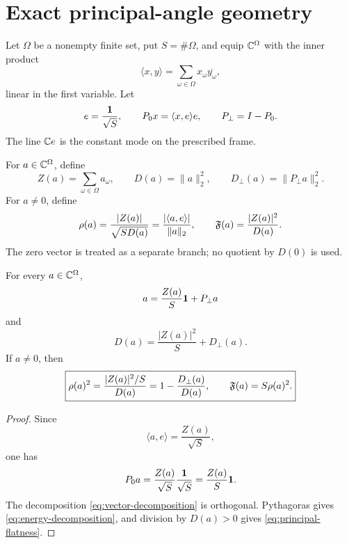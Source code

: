 \section{Exact principal-angle geometry}
\label{sec:principal-angle-geometry}

Let \(\Omega\) be a nonempty finite set, put \(S=\#\Omega\), and
equip \(\mathbb C^\Omega\) with the inner product
\[
 \langle x,y\rangle
 =\sum_{\omega\in\Omega}x_\omega\overline{y_\omega},
\]
linear in the first variable.  Let
\[
 e=\frac{\mathbf 1}{\sqrt S},\qquad
 P_0x=\langle x,e\rangle e,\qquad
 P_\perp=I-P_0.
\]
The line \(\mathbb C e\) is the constant mode on the prescribed frame.

\begin{definition}
\label{def:literal-finite-statistics}
For \(a\in\mathbb C^\Omega\), define
\[
 Z(a)=\sum_{\omega\in\Omega}a_\omega,\qquad
 D(a)=\|a\|_2^2,\qquad
 D_\perp(a)=\|P_\perp a\|_2^2.
\]
For \(a\ne0\), define
\begin{equation}
 \rho(a)
 =\frac{|Z(a)|}{\sqrt{S D(a)}}
 =\frac{|\langle a,e\rangle|}{\|a\|_2},
\qquad
 \mathfrak F(a)=\frac{|Z(a)|^2}{D(a)}.
\label{eq:rho-flat-def}
\end{equation}
The zero vector is treated as a separate branch; no quotient by
\(D(0)\) is used.
\end{definition}

\begin{theorem}
\label{thm:orthogonal-decomposition}
For every \(a\in\mathbb C^\Omega\),
\begin{equation}
 a=\frac{Z(a)}{S}\mathbf 1+P_\perp a
\label{eq:vector-decomposition}
\end{equation}
and
\begin{equation}
 \boxed{
 D(a)=\frac{|Z(a)|^2}{S}+D_\perp(a).}
\label{eq:energy-decomposition}
\end{equation}
If \(a\ne0\), then
\begin{equation}
 \boxed{
 \rho(a)^2
 =\frac{|Z(a)|^2/S}{D(a)}
 =1-\frac{D_\perp(a)}{D(a)},
 \qquad
 \mathfrak F(a)=S\rho(a)^2.}
\label{eq:principal-flatness}
\end{equation}
\end{theorem}

\begin{proof}
Since
\[
 \langle a,e\rangle=\frac{Z(a)}{\sqrt S},
\]
one has
\[
 P_0a=\frac{Z(a)}{\sqrt S}\frac{\mathbf 1}{\sqrt S}
 =\frac{Z(a)}{S}\mathbf 1.
\]
The decomposition \eqref{eq:vector-decomposition} is orthogonal.
Pythagoras gives \eqref{eq:energy-decomposition}, and division by
\(D(a)>0\) gives \eqref{eq:principal-flatness}.
\end{proof}

